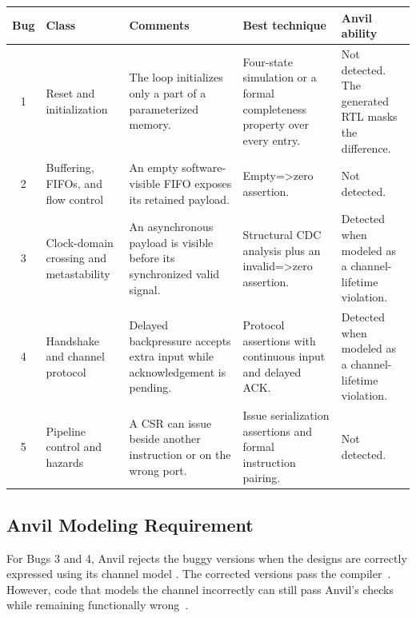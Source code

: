 \documentclass[conference]{IEEEtran}
\begin{document}
\begingroup
\centering
\footnotesize
\setlength{\tabcolsep}{3pt}
\renewcommand{\arraystretch}{1.0}
\begin{tabularx}{\textwidth}{c p{} X p{} p{}}
\hline
\textbf{Bug} & \textbf{Class} & \textbf{Comments} &
\textbf{Best technique} & \textbf{Anvil ability} \\
\hline
1 & Reset and initialization &
The loop initializes only a part of a parameterized memory. &
Four-state simulation or a formal completeness property over every entry. &
Not detected. The generated RTL masks the difference. \\
\hline

2 & Buffering, FIFOs, and flow control &
An empty software-visible FIFO exposes its retained payload. &
Empty=>zero assertion. &
Not detected. \\
\hline

3 & Clock-domain crossing and metastability &
An asynchronous payload is visible before its synchronized valid signal. &
Structural CDC analysis plus an invalid=>zero assertion. &
Detected when modeled as a channel-lifetime violation. \\
\hline

4 & Handshake and channel protocol &
Delayed backpressure accepts extra input while acknowledgement is pending. &
Protocol assertions with continuous input and delayed ACK. &
Detected when modeled as a channel-lifetime violation. \\
\hline

5 & Pipeline control and hazards &
A CSR can issue beside another instruction or on the wrong port. &
Issue serialization assertions and formal instruction pairing. &
Not detected. \\
\hline
\end{tabularx}
\par
\endgroup



\subsection{Anvil Modeling Requirement}

For Bugs 3 and 4, Anvil rejects the buggy versions when the designs are
correctly expressed using its channel model
\cite{bug3-anvil-buggy,bug4-anvil-buggy}. The corrected versions pass the
compiler~\cite{bug3-anvil-fixed,bug4-anvil-fixed}. However, code that models
the channel incorrectly can still pass Anvil's checks while remaining
functionally wrong~\cite{bug3-anvil-semantic,bug4-anvil-semantic}.
\end{document}
